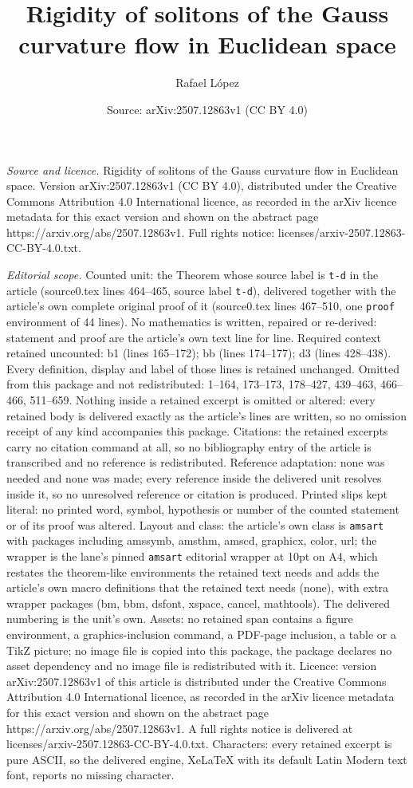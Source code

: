 \documentclass[10pt,a4paper]{amsart}
\title[Rigidity of solitons of the Gauss curvature flow in Euclidea]{Rigidity of solitons of the Gauss curvature flow in Euclidean space}
\author{Rafael L\'opez}
\date{Source: arXiv:2507.12863v1 (CC BY 4.0)}
\begin{document}
\maketitle

\noindent\emph{Source and licence.} Rigidity of solitons of the Gauss curvature flow in Euclidean space. Version arXiv:2507.12863v1 (CC BY 4.0), distributed under the Creative Commons Attribution 4.0 International licence, as recorded in the arXiv licence metadata for this exact version and shown on the abstract page https://arxiv.org/abs/2507.12863v1. Full rights notice: licenses/arxiv-2507.12863-CC-BY-4.0.txt.\par\smallskip

\noindent\textit{Editorial scope.} Counted unit: the Theorem whose source label is \texttt{t-d} in the article (source0.tex lines 464--465, source label \texttt{t-d}), delivered together with the article's own complete original proof of it (source0.tex lines 467--510, one \texttt{proof} environment of 44 lines). No mathematics is written, repaired or re-derived: statement and proof are the article's own text line for line. Required context retained uncounted: b1 (lines 165--172); bb (lines 174--177); d3 (lines 428--438). Every definition, display and label of those lines is retained unchanged. Omitted from this package and not redistributed: 1--164, 173--173, 178--427, 439--463, 466--466, 511--659. Nothing inside a retained excerpt is omitted or altered: every retained body is delivered exactly as the article's lines are written, so no omission receipt of any kind accompanies this package. Citations: the retained excerpts carry no citation command at all, so no bibliography entry of the article is transcribed and no reference is redistributed. Reference adaptation: none was needed and none was made; every reference inside the delivered unit resolves inside it, so no unresolved reference or citation is produced. Printed slips kept literal: no printed word, symbol, hypothesis or number of the counted statement or of its proof was altered. Layout and class: the article's own class is \texttt{amsart} with packages including amssymb, amsthm, amscd, graphicx, color, url; the wrapper is the lane's pinned \texttt{amsart} editorial wrapper at 10pt on A4, which restates the theorem-like environments the retained text needs and adds the article's own macro definitions that the retained text needs (none), with extra wrapper packages (bm, bbm, dsfont, xspace, cancel, mathtools). The delivered numbering is the unit's own. Assets: no retained span contains a figure environment, a graphics-inclusion command, a PDF-page inclusion, a table or a TikZ picture; no image file is copied into this package, the package declares no asset dependency and no image file is redistributed with it. Licence: version arXiv:2507.12863v1 of this article is distributed under the Creative Commons Attribution 4.0 International licence, as recorded in the arXiv licence metadata for this exact version and shown on the abstract page https://arxiv.org/abs/2507.12863v1. A full rights notice is delivered at licenses/arxiv-2507.12863-CC-BY-4.0.txt. Characters: every retained excerpt is pure ASCII, so the delivered engine, XeLaTeX with its default Latin Modern text font, reports no missing character.
\end{document}
